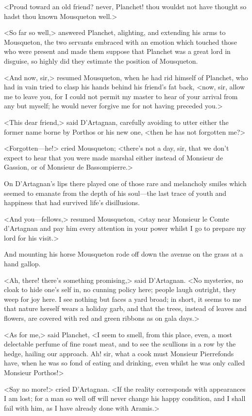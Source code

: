 <Proud toward an old friend? never, Planchet! thou wouldst not have thought so hadst thou known Mousqueton well.>

<So far so well,> answered Planchet, alighting, and extending his arms to Mousqueton, the two servants embraced with an emotion which touched those who were present and made them suppose that Planchet was a great lord in disguise, so highly did they estimate the position of Mousqueton.

<And now, sir,> resumed Mousqueton, when he had rid himself of Planchet, who had in vain tried to clasp his hands behind his friend's fat back, <now, sir, allow me to leave you, for I could not permit my master to hear of your arrival from any but myself; he would never forgive me for not having preceded you.>

<This dear friend,> said D'Artagnan, carefully avoiding to utter either the former name borne by Porthos or his new one, <then he has not forgotten me?>

<Forgotten—he!> cried Mousqueton; <there's not a day, sir, that we don't expect to hear that you were made marshal either instead of Monsieur de Gassion, or of Monsieur de Bassompierre.>

On D'Artagnan's lips there played one of those rare and melancholy smiles which seemed to emanate from the depth of his soul—the last trace of youth and happiness that had survived life's disillusions.

<And you—fellows,> resumed Mousqueton, <stay near Monsieur le Comte d'Artagnan and pay him every attention in your power whilst I go to prepare my lord for his visit.>

And mounting his horse Mousqueton rode off down the avenue on the grass at a hand gallop.

<Ah, there! there's something promising,> said D'Artagnan. <No mysteries, no cloak to hide one's self in, no cunning policy here; people laugh outright, they weep for joy here. I see nothing but faces a yard broad; in short, it seems to me that nature herself wears a holiday garb, and that the trees, instead of leaves and flowers, are covered with red and green ribbons as on gala days.>

<As for me,> said Planchet, <I seem to smell, from this place, even, a most delectable perfume of fine roast meat, and to see the scullions in a row by the hedge, hailing our approach. Ah! sir, what a cook must Monsieur Pierrefonds have, when he was so fond of eating and drinking, even whilst he was only called Monsieur Porthos!>

<Say no more!> cried D'Artagnan. <If the reality corresponds with appearances I am lost; for a man so well off will never change his happy condition, and I shall fail with him, as I have already done with Aramis.> 